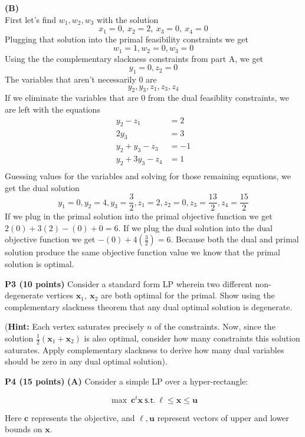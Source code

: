 \documentclass[11pt]{article}
\newcommand\vx {\mathbf{x}}
\begin{document}
\noindent\textbf{(B)}
\\
First let's find $w_1, w_2, w_3$ with the solution 
\[ x_1 = 0,\ x_2 = 2,\ x_3 = 0,\ x_4 = 0 \]
Plugging that solution into the primal feasibility constraints we get
\[w_1 = 1, w_2 = 0, w_3 = 0\]
Using the the complementary slackness constraints from part A, we get
\[y_1 = 0, z_2 = 0\]
The variables that aren't necessarily 0 are
\[y_2, y_3, z_1, z_3, z_4\]
If we eliminate the variables that are 0 from the dual feasiblity constraints, we are left with the equations
\begin{align*}
y_2 - z_1 &= 2 \\
2y_3 &= 3 \\
y_2 + y_3 - z_3 &= -1 \\
y_2 + 3y_3 - z_4 &= 1 \\
\end{align*}
Guessing values for the variables and solving for those remaining equations, we get the dual solution
\[y_1 = 0, y_2 = 4, y_3 = \frac{3}{2}, z_1 = 2, z_2 = 0, z_3 = \frac{13}{2}, z_4 = \frac{15}{2}\]
If we plug in the primal solution into the primal objective function we get 
$2(0) + 3(2) - (0) + 0 = 6$.  If we plug the dual solution into the dual objective function we get $-(0) + 4(\frac{3}{2}) = 6$.  Because both the dual and primal solution produce the same objective function value we know that the primal solution is optimal.

\bigskip

\noindent\textbf{P3 (10 points)} Consider a standard form LP wherein
two different non-degenerate vertices $\vx_1,\ \vx_2$ are both optimal for the primal. Show using the
complementary slackness theorem that any dual optimal solution
is degenerate.

(\textbf{Hint:} Each vertex saturates precisely $n$ of the
constraints. Now, since the solution $\frac{1}{2} (\vx_1 + \vx_2)$
is also optimal, consider how many constraints this solution
saturates. Apply complementary slackness to derive how many
dual variables should be zero in any dual optimal solution).
\\


\bigskip

\noindent\textbf{P4 (15 points)} \noindent\textbf{(A)} Consider a
simple LP over a hyper-rectangle:

\[ \max\ \mathbf{c}^t \mathbf{x}\ \mathsf{s.t.}\ \ell \leq \mathbf{x}
\leq \mathbf{u} \]

Here $\mathbf{c}$ represents the objective, and $\ell, \mathbf{u}$
represent vectors of upper and lower bounds on $\mathbf{x}$. 
\end{document}
